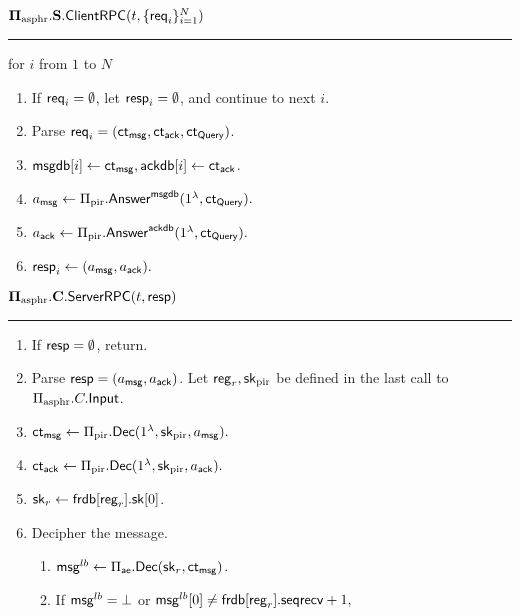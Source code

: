 \begin{definition}
\vspace{10pt}
$\mathbf{\Pi_{\text{asphr}}.S.\mathsf{ClientRPC}}(t, \{\mathsf{req}_i\}_{i = 1}^N)$
\vspace{5pt}
\hrule
\vspace{5pt}
\item for $i$ from $1$ to $N$
\begin{enumerate}
    \item If $\mathsf{req}_i = \emptyset$, let $\mathsf{resp}_i = \emptyset$, and continue to next $i$. 
    \item Parse $\mathsf{req}_i = (\mathsf{ct}_{\mathsf{msg}}, \mathsf{ct}_{\mathsf{ack}}, \mathsf{ct}_{\mathsf{Query}})$.
    \item $\mathsf{msgdb}[i] \leftarrow \mathsf{ct}_{\mathsf{msg}}, \mathsf{ackdb}[i] \leftarrow \mathsf{ct}_{\mathsf{ack}}$.
    \item $a_{\mathsf{msg}} \leftarrow \Pi_{\text{pir}}.\mathsf{Answer}^{\mathsf{msgdb}}(1^{\lambda}, \mathsf{ct}_{\mathsf{Query}}).$
    \item $a_{\mathsf{ack}} \leftarrow \Pi_{\text{pir}}.\mathsf{Answer}^{\mathsf{ackdb}}(1^{\lambda}, \mathsf{ct}_{\mathsf{Query}}).$
    \item $\mathsf{resp}_i \leftarrow (a_{\mathsf{msg}}, a_{\mathsf{ack}}).$
\end{enumerate}
\vspace{10pt}
$\mathbf{\Pi_{\text{asphr}}.C.\mathsf{ServerRPC}}(t, \mathsf{resp})$
\vspace{5pt}
\hrule
\vspace{5pt}
\begin{enumerate}
    \item If $\mathsf{resp} = \emptyset$, return.
    \item Parse $\mathsf{resp} = (a_{\mathsf{msg}}, a_{\mathsf{ack}})$. Let $\mathsf{reg}_r, {\mathsf{sk}}_{\text{pir}}$ be defined in the last call to $\Pi_{\text{asphr}}.C.\mathsf{Input}$.
    \item $\mathsf{ct}_{\mathsf{msg}} \leftarrow \Pi_{\text{pir}}.\mathsf{Dec}(1^{\lambda}, {\mathsf{sk}}_{\text{pir}}, a_{\mathsf{msg}}).$
    \item $\mathsf{ct}_{\mathsf{ack}} \leftarrow \Pi_{\text{pir}}.\mathsf{Dec}(1^{\lambda}, {\mathsf{sk}}_{\text{pir}}, a_{\mathsf{ack}}).$
    \item ${\mathsf{sk}}_{r} \leftarrow \mathsf{frdb}[\mathsf{reg}_r].{\mathsf{sk}}[0]$.
    \item Decipher the message.
    \begin{enumerate}
        \item $\mathsf{msg}^{lb} \leftarrow \Pi_{\mathsf{ae}}.\mathsf{Dec}({\mathsf{sk}}_{r}, \mathsf{ct}_{\mathsf{msg}})$.
        \item If $\mathsf{msg}^{lb} = \bot$ or $\mathsf{msg}^{lb}[0] \neq \mathsf{frdb}[\mathsf{reg}_r].\mathsf{seqrecv} + 1,$

\end{enumerate}
\end{enumerate}
\end{definition}
